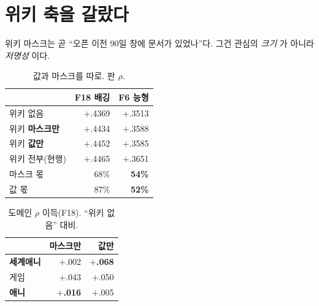 \documentclass[10pt]{article}
\begin{document}

\section{위키 축을 갈랐다}

위키 마스크는 곧 ``오픈 이전 90일 창에 문서가 있었나''다. 그건 관심의
\emph{크기} 가 아니라 \emph{저명성} 이다.

\begin{table}[t]
\centering\tsize
\caption{값과 마스크를 따로. 판 $\rho$.}
\begin{tabular}{lrr}
\toprule
& F18 배깅 & F6 능형 \\
\midrule
위키 없음 & $+$.4369 & $+$.3513 \\
위키 \textbf{마스크만} & $+$.4434 & $+$.3588 \\
위키 \textbf{값만} & $+$.4452 & $+$.3585 \\
위키 전부(현행) & $+$.4465 & $+$.3651 \\
\midrule
마스크 몫 & 68\% & \textbf{54\%} \\
값 몫 & 87\% & \textbf{52\%} \\
\bottomrule
\end{tabular}
\end{table}


\begin{table}[t]
\centering\tsize
\caption{도메인 $\rho$ 이득(F18). ``위키 없음'' 대비.}
\begin{tabular}{lrr}
\toprule
& 마스크만 & 값만 \\
\midrule
\textbf{세계애니} & $+$.002 & \textbf{$+$.068} \\
게임 & $+$.043 & $+$.050 \\
\textbf{애니} & \textbf{$+$.016} & $+$.005 \\
\bottomrule
\end{tabular}
\end{table}
\end{document}
